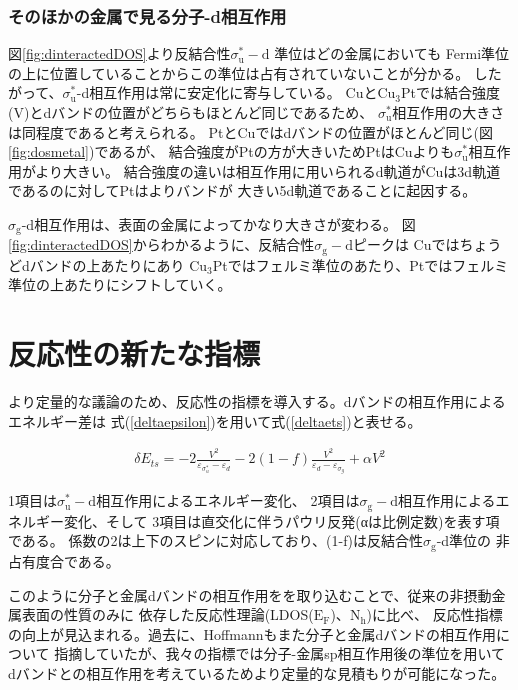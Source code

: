 \documentclass[12pt]{ltjsarticle}
\begin{document}
\subsubsection{そのほかの金属で見る分子-d相互作用}
図\ref{fig:dinteractedDOS}より反結合性$\sigma _\text{u} ^* -\text{d}$ 準位はどの金属においても
Fermi準位の上に位置していることからこの準位は占有されていないことが分かる。
したがって、$ \sigma _\text{u} ^*$-d相互作用は常に安定化に寄与している。
Cuと$\text{Cu}_\text{3}$Ptでは結合強度(V)とdバンドの位置がどちらもほとんど同じであるため、
$ \sigma _\text{u}^*$相互作用の大きさは同程度であると考えられる。
PtとCuではdバンドの位置がほとんど同じ(図\ref{fig:dosmetal})であるが、
結合強度がPtの方が大きいためPtはCuよりも$ \sigma _\text{u}^*$相互作用がより大きい。
結合強度の違いは相互作用に用いられるd軌道がCuは3d軌道であるのに対してPtはよりバンドが
大きい5d軌道であることに起因する。

$\sigma _\text{g}$-d相互作用は、表面の金属によってかなり大きさが変わる。
図\ref{fig:dinteractedDOS}からわかるように、反結合性$\sigma _\text{g}-\text{d}$ピークは
Cuではちょうどdバンドの上あたりにあり
$\text{Cu}_\text{3}$Ptではフェルミ準位のあたり、Ptではフェルミ準位の上あたりにシフトしていく。

\section{反応性の新たな指標}
より定量的な議論のため、反応性の指標を導入する。dバンドの相互作用によるエネルギー差は
式(\ref{deltaepsilon})を用いて式(\ref{deltaets})と表せる。

\begin{eqnarray}
    \label{deltaets}
    \delta E_{ts} = -2 \frac{ V^2 }{\varepsilon _{\sigma_u^*} - \varepsilon _d}
                    -2(1-f)\frac{V^2}{\varepsilon _d - \varepsilon _{\sigma_g}}
                    + \alpha V^2
\end{eqnarray}

1項目は$\sigma _\text{u}^* -\text{d}$相互作用によるエネルギー変化、
2項目は$\sigma _\text{g}-\text{d}$相互作用によるエネルギー変化、そして
3項目は直交化に伴うパウリ反発(αは比例定数)を表す項である。
係数の2は上下のスピンに対応しており、(1-f)は反結合性$\sigma_\text{g}$-d準位の
非占有度合である。

このように分子と金属dバンドの相互作用をを取り込むことで、従来の非摂動金属表面の性質のみに
依存した反応性理論(LDOS($\text{E}_\text{F}$)、$\text{N}_\text{h}$)に比べ、
反応性指標の向上が見込まれる。過去に、Hoffmannもまた分子と金属dバンドの相互作用について
指摘していた\cite{Hoffman1988}が、我々の指標では分子-金属sp相互作用後の準位を用いて
dバンドとの相互作用を考えているためより定量的な見積もりが可能になった。
\end{document}
